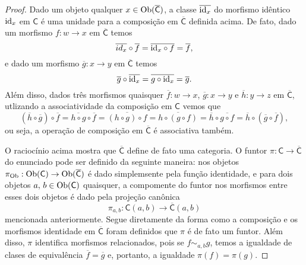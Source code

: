 \begin{proof}
    Dado um objeto qualquer $x \in \mathrm{Ob}(\overline{\mathsf{C}})$, a classe $\overline{\mathrm{id}_x}$ do morfismo idêntico $\mathrm{id}_x$ em $\mathsf{C}$ é uma unidade para a composição em $\overline{\mathsf{C}}$ definida acima.
    De fato, dado um morfismo $f: w \to x$ em $\overline{\mathsf{C}}$ temos
    \begin{displaymath}
        \overline{id_x} \circ \overline{f} = \overline{\mathrm{id}_x \circ f} = \overline{f},
    \end{displaymath}
    e dado um morfismo $\overline{g}: x \to y$ em $\overline{\mathsf{C}}$ temos
    \begin{displaymath}
        \overline{g} \circ \overline{\mathrm{id}_x} = \overline{g \circ \mathrm{id}_x} = \overline{g}.
    \end{displaymath}
    Além disso, dados três morfismos quaisquer $\overline{f}: w \to x$, $\overline{g}: x \to y$ e $\overline{h}: y \to z$ em $\overline{\mathsf{C}}$, utlizando a associatividade da composição em $\mathsf{C}$ vemos que
    \begin{displaymath}
        (\overline{h} \circ \overline{g}) \circ \overline{f}
        = \overline{h \circ g} \circ \overline{f}
        = \overline{(h \circ g) \circ f}
        = \overline{h \circ (g \circ f)}
        = \overline{h} \circ \overline{g \circ f}
        = \overline{h} \circ (\overline{g} \circ \overline{f}),
    \end{displaymath}
    ou seja, a operação de composição em $\overline{\mathsf{C}}$ é associativa também.

    O raciocínio acima mostra que $\overline{\mathsf{C}}$ define de fato uma categoria.
    O funtor $\pi: \mathsf{C} \to \overline{\mathsf{C}}$ do enunciado pode ser definido da seguinte maneira: nos objetos $\pi_{\mathrm{Ob}}: \mathrm{Ob}(\mathsf{C}) \to \mathrm{Ob}(\overline{\mathsf{C}})$ é dado simplemsente pela função identidade, e para dois objetos $a,\,b \in \mathrm{Ob}(\mathsf{C})$ quaisquer, a compomente do funtor nos morfismos entre esses dois objetos é dado pela projeção canônica
    \begin{displaymath}
        \pi_{a,b}: \mathsf{C}(a,b) \to \overline{\mathsf{C}}(a,b)
    \end{displaymath}
    mencionada anteriormente.
    Segue diretamente da forma como a composição e os morfismos identidade em $\overline{\mathsf{C}}$ foram definidos que $\pi$ é de fato um funtor.
    Além disso, $\pi$ identifica morfismos relacionados, pois se $f \sim_{a,b} g$, temos a igualdade de clases de equivalência $\overline{f} = \overline{g}$ e, portanto, a igualdade $\pi(f) = \pi(g)$.


\end{proof}

